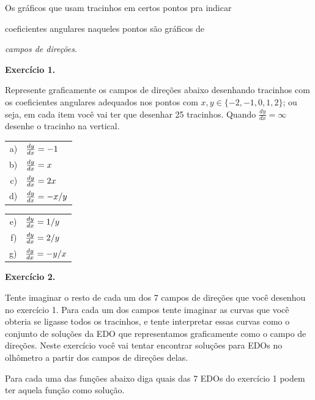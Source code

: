 \documentclass[oneside,12pt]{article}
\begin{document}
\ssk

Os gráficos que usam tracinhos em certos pontos pra indicar

coeficientes angulares naqueles pontos são gráficos de

{\sl campos de direções}.

\msk



{\bf Exercício 1.}

Represente graficamente os campos de direções abaixo desenhando
tracinhos com os coeficientes angulares adequados nos pontos com
$x,y∈\{-2,-1,0,1,2\}$; ou seja, em cada item você vai ter que desenhar
25 tracinhos. Quando $\frac{dy}{dx} = ∞$ desenhe o tracinho na
vertical.

\msk

\begin{tabular}[t]{rl}
a) & $\frac{dy}{dx} = -1$ \\
b) & $\frac{dy}{dx} = x$ \\
c) & $\frac{dy}{dx} = 2x$ \\
d) & $\frac{dy}{dx} = -x/y$ \\
\end{tabular}
\qquad
\begin{tabular}[t]{rl}
e) & $\frac{dy}{dx} = 1/y$ \\
f) & $\frac{dy}{dx} = 2/y$ \\
g) & $\frac{dy}{dx} = -y/x$ \\
\end{tabular}

\newpage


{\bf Exercício 2.}

Tente imaginar o resto de cada um dos 7 campos de direções que você
desenhou no exercício 1. Para cada um dos campos tente imaginar as
curvas que você obteria se ligasse todos os tracinhos, e tente
interpretar essas curvas como o conjunto de soluções da EDO que
representamos graficamente como o campo de direções. Neste exercício
você vai tentar encontrar soluções para EDOs no olhômetro a partir dos
campos de direções delas.

Para cada uma das funções abaixo diga quais das 7 EDOs do exercício 1
podem ter aquela função como solução.

\msk
\end{document}
